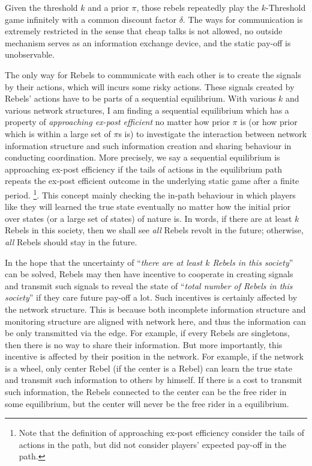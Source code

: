 \documentclass[12pt,letter]{article}
\theoremstyle{remark}
\theoremstyle{remark}
\theoremstyle{claim}
\begin{document}
Given the threshold $k$ and a prior $\pi$, those rebels repeatedly play the $k$-Threshold game infinitely with a common discount factor $\delta$. The ways for communication is extremely restricted in the sense that cheap talks is not allowed, no outside mechanism serves as an information exchange device, and the static pay-off is unobservable.

The only way for Rebels to communicate with each other is to create the signals by their actions, which will incurs some risky actions. These signals created by Rebels' actions have to be parts of a sequential equilibrium. With various $k$ and various network structures, I am finding a sequential equilibrium which has a property of \textit{approaching ex-post efficient} no matter how prior $\pi$ is (or how prior which is within a large set of $\pi$s is) to investigate the interaction between network information structure and such information creation and sharing behaviour in conducting coordination. More precisely, we say a sequential equilibrium is approaching ex-post efficiency if the tails of actions in the equilibrium path repeats the ex-post efficient outcome in the underlying static game after a finite period. \footnote{Note that the definition of approaching ex-post efficiency consider the tails of actions in the path, but did not consider players' expected pay-off in the path.}. This concept mainly checking the in-path  behaviour in which players  like they will learned the true state eventually no matter how the initial prior over states (or a large set of states) of nature is. In words, if there are at least $k$ Rebels in this society, then we shall see \textit{all} Rebels revolt in the future; otherwise, \textit{all} Rebels should stay in the future.

In the hope that the uncertainty of ``\textit{there are at least $k$ Rebels in this society}'' can be solved, Rebels may then have incentive to cooperate in creating signals and transmit such signals to reveal the state of ``\textit{total number of Rebels in this society}'' if they care future pay-off a lot. Such incentives is certainly affected by the network structure. This is because both incomplete information structure and monitoring structure are aligned with network here, and thus the information can be only transmitted via the edge. For example, if every Rebels are singletons, then there is no way to share their information. But more importantly, this incentive is affected by their position in the network. For example, if the network is a wheel, only center Rebel (if the center is a Rebel) can learn the true state and transmit such information to others by himself. If there is a cost to transmit such information, the Rebels connected to the center can be the free rider in some equilibrium, but the center will never be the free rider in a equilibrium.   
\end{document}

